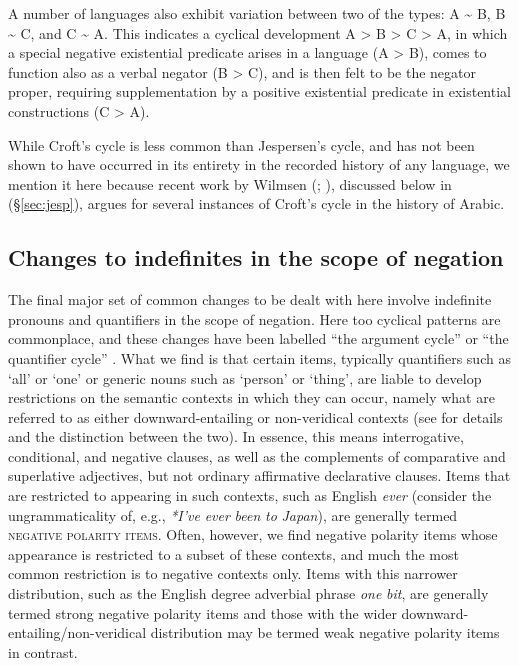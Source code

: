 \documentclass[output=paper]{langsci/langscibook}
\begin{document}
A number of languages also exhibit variation between two of the types: A {\textasciitilde} B, B {\textasciitilde} C, and C {\textasciitilde} A. This indicates a cyclical development A > B > C > A, in which a special negative existential predicate arises in a language (A > B), comes to function also as a verbal negator (B > C), and is then felt to be the negator proper, requiring supplementation by a positive existential predicate in existential constructions (C > A). 

While Croft’s cycle is less common than Jespersen’s cycle, and has not been shown to have occurred in its entirety in the recorded history of any language, we mention it here because recent work by Wilmsen (\citeyear[174–176]{Wilmsen2014}; \citeyear{Wilmsen2016}), discussed below in (§\ref{sec:jesp}), argues for several instances of Croft’s cycle in the history of Arabic.



\subsection{Changes to indefinites in the scope of negation}\label{sec:ind}


The final major set of common changes to be dealt with here involve indefinite pronouns and quantifiers in the scope of negation. Here too cyclical patterns are commonplace, and these changes have been labelled “the argument cycle” \citep{Ladusaw1993} or “the quantifier cycle” \citep{Willis2011}. What we find is that certain items, typically quantifiers such as ‘all’ or ‘one’ or generic nouns such as ‘person’ or ‘thing’, are liable to develop restrictions on the semantic contexts in which they can occur, namely what are referred to as either downward-entailing or non-veridical contexts (see \citealt{Giannakidou1998} for details and the distinction between the two). In essence, this means interrogative, conditional, and negative clauses, as well as the complements of comparative and superlative adjectives, but not ordinary affirmative declarative clauses. Items that are restricted to appearing in such contexts, such as English \textit{ever} (consider the ungrammaticality of, e.g., \textit{*I’ve} \textit{ever} \textit{been} \textit{to} \textit{Japan}), are generally termed \textsc{negative} \textsc{polarity} \textsc{items}. Often, however, we find negative polarity items whose appearance is restricted to a subset of these contexts, and much the most common restriction is to negative contexts only. Items with this narrower distribution, such as the English degree adverbial phrase \textit{one} \textit{bit}, are generally termed strong negative polarity items and those with the wider downward-entailing/non-veridical distribution may be termed weak negative polarity items in contrast. 
\end{document}
